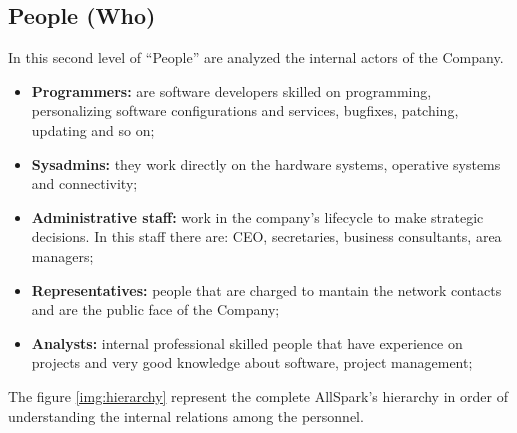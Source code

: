 \subsection{People (Who)}
\label{subsec:enterprise[People]}
In this second level of ``People'' are analyzed the internal actors of the Company.
\begin{itemize}
 \item {\bf Programmers:} are software developers skilled on programming, personalizing software configurations and services, bugfixes, patching, updating and so on;
 \item {\bf Sysadmins:} they work directly on the hardware systems, operative systems and connectivity;
 \item {\bf Administrative staff:} work in the company's lifecycle to make strategic decisions. In this staff there are: CEO, secretaries, business consultants, area managers;
 \item {\bf Representatives:} people that are charged to mantain the network contacts and are the public face of the Company;
 \item {\bf Analysts:} internal professional skilled people that have experience on projects and very good knowledge about software, project management;
\end{itemize}

The figure \ref{img:hierarchy} represent the complete AllSpark's hierarchy in order of understanding the internal relations among the personnel.

